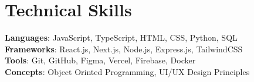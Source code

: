 \documentclass[letterpaper,11pt]{article}
\begin{document}
\section{Technical Skills}
 \begin{itemize}[leftmargin=0.15in, label={}]
    \small{\item{
     \textbf{Languages}{: JavaScript, TypeScript, HTML, CSS, Python, SQL} \\
     \textbf{Frameworks}{: React.js, Next.js, Node.js, Express.js, TailwindCSS} \\
     \textbf{Tools}{: Git, GitHub, Figma, Vercel, Firebase, Docker} \\
     \textbf{Concepts}{: Object Orinted Programming, UI/UX Design Principles } \\
    }}
 \end{itemize}

\end{document}
